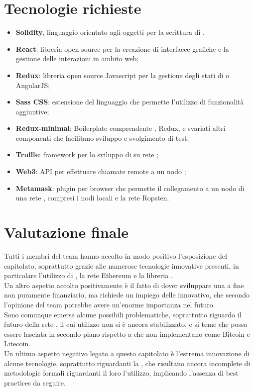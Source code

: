 \documentclass[StudioDiFattibilità.tex]{subfiles}
\begin{document}
\section{Tecnologie richieste}
\begin{itemize}
	\item \textbf{Solidity}, linguaggio orientato agli oggetti per la scrittura di .
	\item \textbf{React}: libreria open source  per la creazione di interfacce grafiche e la gestione delle interazioni in ambito web;
	\item \textbf{Redux}: libreria open source Javascript per la gestione degli stati di  o AngularJS;
	\item \textbf{Sass CSS}: estensione del linguaggio  che permette l'utilizzo di funzionalità aggiuntive;
	\item \textbf{Redux-minimal}: Boilerplate comprendente , Redux,  e svariati altri componenti che facilitano sviluppo e svolgimento di test;
	\item \textbf{Truffle}: framework per lo sviluppo di  su rete ;
	\item \textbf{Web3}: API  per effettuare chiamate remote a un nodo ;
	\item \textbf{Metamask}: plugin per browser che permette il collegamento a un nodo di una rete , compresi i nodi locali e la rete Ropsten.
\end{itemize}
\section{Valutazione finale}
Tutti i membri del team hanno accolto in modo positivo l'esposizione del capitolato, soprattutto grazie alle numerose tecnologie innovative presenti, in particolare l'utilizzo di , la rete Ethereum e la libreria .\\
Un altro aspetto accolto positivamente è il fatto di dover sviluppare una  a fine non puramente finanziario, ma richiede un impiego delle  innovativo, che secondo l'opinione del team potrebbe avere un'enorme importanza nel futuro.\\
Sono comunque emerse alcune possibili problematiche, soprattutto riguardo il futuro della rete , il cui utilizzo non si è ancora stabilizzato, e si teme che possa essere lasciata in secondo piano rispetto a  che non implementano  come Bitcoin e Litecoin.\\
Un ultimo aspetto negativo legato a questo capitolato è l'estrema innovazione di alcune tecnologie, soprattutto riguardanti la , che risultano ancora incomplete di metodologie formali riguardanti il loro l'utilizzo, implicando l'assenza di best practices da seguire.
\end{document}
